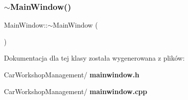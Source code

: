 \subsubsection{$\sim$MainWindow()}
{\footnotesize\ttfamily Main\+Window\+::$\sim$\+Main\+Window (\begin{DoxyParamCaption}{ }\end{DoxyParamCaption})}



Dokumentacja dla tej klasy została wygenerowana z plików\+:\begin{DoxyCompactItemize}
\item 
Car\+Workshop\+Management/\textbf{ mainwindow.\+h}\item 
Car\+Workshop\+Management/\textbf{ mainwindow.\+cpp}\end{DoxyCompactItemize}

